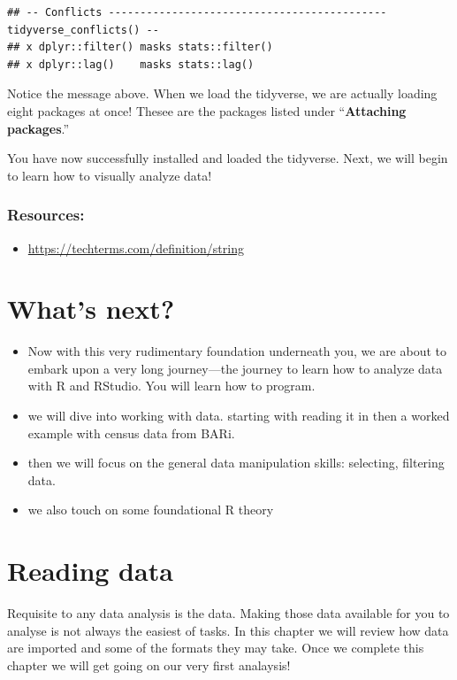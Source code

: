 \documentclass[
]{book}
\providecommand{\tightlist}{%
  \setlength{\itemsep}{0pt}\setlength{\parskip}{0pt}}
\begin{document}
\begin{verbatim}
## -- Conflicts -------------------------------------------- tidyverse_conflicts() --
## x dplyr::filter() masks stats::filter()
## x dplyr::lag()    masks stats::lag()
\end{verbatim}

Notice the message above. When we load the tidyverse, we are actually loading eight packages at once! Thesee are the packages listed under ``\textbf{Attaching packages}.''

You have now successfully installed and loaded the tidyverse. Next, we will begin to learn how to visually analyze data!

\hypertarget{resources}{%
\subsection{Resources:}\label{resources}}

\begin{itemize}
\tightlist
\item
  \url{https://techterms.com/definition/string}
\end{itemize}

\hypertarget{whats-next}{%
\chapter{What's next?}\label{whats-next}}

\begin{itemize}
\tightlist
\item
  Now with this very rudimentary foundation underneath you, we are about to embark upon a very long journey---the journey to learn how to analyze data with R and RStudio. You will learn how to program.
\item
  we will dive into working with data. starting with reading it in then a worked example with census data from BARi.
\item
  then we will focus on the general data manipulation skills: selecting, filtering data.
\item
  we also touch on some foundational R theory
\end{itemize}

\hypertarget{reading-data}{%
\chapter{Reading data}\label{reading-data}}

Requisite to any data analysis is the data. Making those data available for you to analyse is not always the easiest of tasks. In this chapter we will review how data are imported and some of the formats they may take. Once we complete this chapter we will get going on our very first analaysis!
\end{document}
